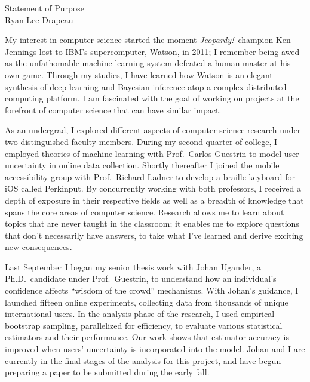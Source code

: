 \setlength{\oddsidemargin}{0in}
\setlength{\evensidemargin}{0in}
\setlength{\textwidth}{6.5in}
\setlength{\topmargin}{-.95in}
\setlength{\textheight}{9.75in}
\pagestyle{empty}



\begin{center}
    {\Large Statement of Purpose}\\[2 mm]
    {\large Ryan Lee Drapeau}
\end{center}

My interest in computer science started the moment {\it{Jeopardy!}}\ champion Ken Jennings lost to IBM's supercomputer, Watson, in 2011; I remember being awed as the unfathomable machine learning system defeated a human master at his own game. Through my studies, I have learned how Watson is an elegant synthesis of deep learning and Bayesian inference atop a complex distributed computing platform. I am fascinated with the goal of working on projects at the forefront of computer science that can have similar impact.\vspace{2 mm}

As an undergrad, I explored different aspects of computer science research under two distinguished faculty members. During my second quarter of college, I employed theories of machine learning with Prof.\ Carlos Guestrin to model user uncertainty in online data collection. Shortly thereafter I joined the mobile accessibility group with Prof.\ Richard Ladner to develop a braille keyboard for iOS called Perkinput. By concurrently working with both professors, I received a depth of exposure in their respective fields as well as a breadth of knowledge that spans the core areas of computer science. Research allows me to learn about topics that are never taught in the classroom; it enables me to explore questions that don't necessarily have answers, to take what I've learned and derive exciting new consequences.\vspace{2 mm}

Last September I began my senior thesis work with Johan Ugander, a Ph.D.\ candidate under Prof.\ Guestrin, to understand how an individual's confidence affects ``wisdom of the crowd'' mechanisms. With Johan's guidance, I launched fifteen online experiments, collecting data from thousands of unique international users. In the analysis phase of the research, I used empirical bootstrap sampling, parallelized for efficiency, to evaluate various statistical estimators and their performance. Our work shows that estimator accuracy is improved when users' uncertainty is incorporated into the model. Johan and I are currently in the final stages of the analysis for this project, and have begun preparing a paper to be submitted during the early fall.\vspace{2 mm}

